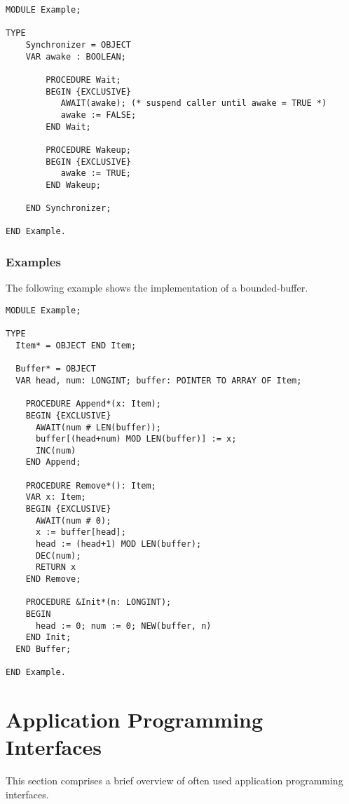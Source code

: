 \documentclass[a4paper,11pt]{article}
\begin{document}
\begin{lstlisting}[language=Oberon,frame=none,caption=Example of object synchronization]
MODULE Example;

TYPE
    Synchronizer = OBJECT
    VAR awake : BOOLEAN;

        PROCEDURE Wait;
        BEGIN {EXCLUSIVE}
           AWAIT(awake); (* suspend caller until awake = TRUE *)
           awake := FALSE;
        END Wait;

        PROCEDURE Wakeup;
        BEGIN {EXCLUSIVE}
           awake := TRUE;
        END Wakeup;

    END Synchronizer;

END Example.
\end{lstlisting}

\subsubsection{Examples}
The following example shows the implementation of a bounded-buffer.

\begin{lstlisting}[language=Oberon,frame=none,caption={Bounded-buffer}]
MODULE Example;

TYPE
  Item* = OBJECT END Item;

  Buffer* = OBJECT
  VAR head, num: LONGINT; buffer: POINTER TO ARRAY OF Item;

    PROCEDURE Append*(x: Item);
    BEGIN {EXCLUSIVE}
      AWAIT(num # LEN(buffer));
      buffer[(head+num) MOD LEN(buffer)] := x;
      INC(num)
    END Append;

    PROCEDURE Remove*(): Item;
    VAR x: Item;
    BEGIN {EXCLUSIVE}
      AWAIT(num # 0);
      x := buffer[head];
      head := (head+1) MOD LEN(buffer);
      DEC(num);
      RETURN x
    END Remove;

    PROCEDURE &Init*(n: LONGINT);
    BEGIN
      head := 0; num := 0; NEW(buffer, n)
    END Init;
  END Buffer;

END Example.
\end{lstlisting}

\section{Application Programming Interfaces}
This section comprises a brief overview of often used application programming interfaces.
\end{document}

